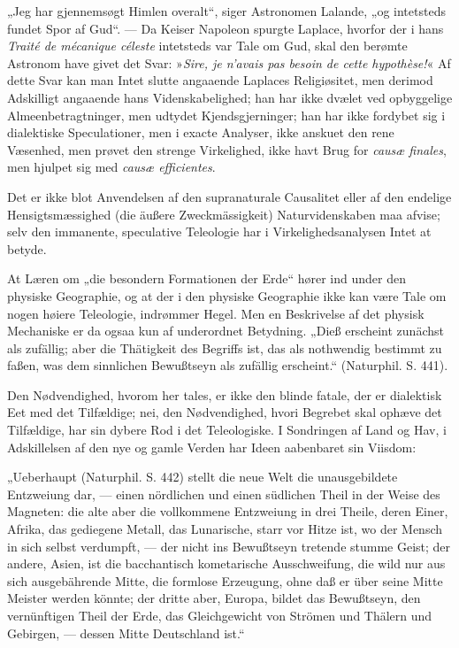 \documentclass[12pt]{book}
\newcommand{\opage}[1]{\marginnote{\footnotesize\textit{[#1]}}}
\begin{document}
„Jeg har gjennemsøgt Himlen overalt“, siger Astronomen Lalande, „og intetsteds
fundet Spor af Gud“. --- Da Keiser Napoleon spurgte Laplace, hvorfor der i hans
\textit{Traité de mécanique céleste} intetsteds var Tale om Gud, skal den berømte
Astronom have givet det Svar: »\textit{Sire, je n'avais pas besoin de cette
hypothèse!}« Af dette Svar kan man Intet slutte angaaende Laplaces Religiøsitet,
men derimod Adskilligt angaaende hans Videnskabelighed; han har ikke dvælet ved
opbyggelige Almeenbetragtninger, men udtydet Kjendsgjerninger; han har ikke
fordybet sig i dialektiske Speculationer, men i exacte Analyser, ikke anskuet den
rene Væsenhed, men prøvet den strenge Virkelighed, ikke havt Brug for
\textit{causæ finales}, men hjulpet sig med \textit{causæ efficientes}.

Det er ikke blot Anvendelsen af den supranaturale Causalitet eller af den
endelige Hensigtsmæssighed (die äußere Zweckmässigkeit) Naturvidenskaben maa
afvise; selv den immanente, speculative Teleologie har i Virkelighedsanalysen
Intet at betyde.

At Læren om „die besondern Formationen der Erde“ hører ind under den physiske
Geographie, og at der i den physiske Geographie ikke kan være Tale om nogen
høiere Teleologie, indrømmer Hegel. Men en Beskrivelse af det physisk Mechaniske
er da ogsaa kun af underordnet Betydning. „Dieß erscheint zunächst als zufällig;
aber die Thätigkeit des Begriffs ist, das als nothwendig bestimmt
\opage{173} zu faßen, was dem sinnlichen Bewußtseyn als zufällig erscheint.“ (Naturphil. S. 441).

Den Nødvendighed, hvorom her tales, er ikke den blinde fatale, der er dialektisk Eet med det
Tilfældige; nei, den Nødvendighed, hvori Begrebet skal ophæve det Tilfældige, har sin dybere Rod
i det Teleologiske. I Sondringen af Land og Hav, i Adskillelsen af den nye og gamle Verden har
Ideen aabenbaret sin Viisdom:

„Ueberhaupt (Naturphil. S. 442) stellt die neue Welt die unausgebildete Entzweiung dar, ---
einen nördlichen und einen südlichen Theil in der Weise des Magneten: die alte aber die
vollkommene Entzweiung in drei Theile, deren Einer, Afrika, das gediegene Metall, das Lunarische,
starr vor Hitze ist, wo der Mensch in sich selbst verdumpft, --- der nicht ins Bewußtseyn tretende
stumme Geist; der andere, Asien, ist die bacchantisch kometarische Ausschweifung, die wild nur aus
sich ausgebährende Mitte, die formlose Erzeugung, ohne daß er über seine Mitte Meister werden
könnte; der dritte aber, Europa, bildet das Bewußtseyn, den vernünftigen Theil der Erde, das
Gleichgewicht von Strömen und Thälern und Gebirgen, --- dessen Mitte Deutschland ist.“
\end{document}

